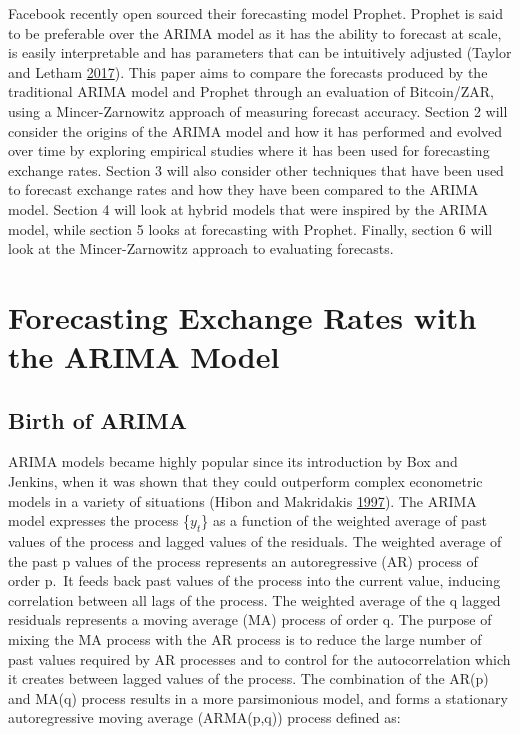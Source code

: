 \documentclass[12pt,preprint, authoryear]{elsarticle}
\numberwithin{equation}{section}
\numberwithin{figure}{section}
\numberwithin{table}{section}
\begin{document}
Facebook recently open sourced their forecasting model Prophet. Prophet
is said to be preferable over the ARIMA model as it has the ability to
forecast at scale, is easily interpretable and has parameters that can
be intuitively adjusted (Taylor and Letham
\protect\hyperlink{ref-taylor2017}{2017}). This paper aims to compare
the forecasts produced by the traditional ARIMA model and Prophet
through an evaluation of Bitcoin/ZAR, using a Mincer-Zarnowitz approach
of measuring forecast accuracy. Section 2 will consider the origins of
the ARIMA model and how it has performed and evolved over time by
exploring empirical studies where it has been used for forecasting
exchange rates. Section 3 will also consider other techniques that have
been used to forecast exchange rates and how they have been compared to
the ARIMA model. Section 4 will look at hybrid models that were inspired
by the ARIMA model, while section 5 looks at forecasting with Prophet.
Finally, section 6 will look at the Mincer-Zarnowitz approach to
evaluating forecasts.

\section{Forecasting Exchange Rates with the ARIMA
Model}\label{forecasting-exchange-rates-with-the-arima-model}

\subsection{Birth of ARIMA}\label{birth-of-arima}

ARIMA models became highly popular since its introduction by Box and
Jenkins, when it was shown that they could outperform complex
econometric models in a variety of situations (Hibon and Makridakis
\protect\hyperlink{ref-spyros1997}{1997}). The ARIMA model expresses the
process \{\(y_t\)\} as a function of the weighted average of past values
of the process and lagged values of the residuals. The weighted average
of the past p values of the process represents an autoregressive (AR)
process of order p.~It feeds back past values of the process into the
current value, inducing correlation between all lags of the process. The
weighted average of the q lagged residuals represents a moving average
(MA) process of order q. The purpose of mixing the MA process with the
AR process is to reduce the large number of past values required by AR
processes and to control for the autocorrelation which it creates
between lagged values of the process. The combination of the AR(p) and
MA(q) process results in a more parsimonious model, and forms a
stationary autoregressive moving average (ARMA(p,q)) process defined as:
\end{document}
